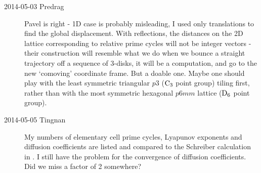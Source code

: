 \begin{description}
\item[2014-05-03 Predrag] Pavel is right - 1D case is probably
misleading, I used only translations to find the global displacement.
With reflections, the distances on the 2D lattice corresponding to
relative prime cycles will not be integer vectors - their construction
will resemble what we do when we bounce a straight trajectory off a
sequence of 3-disks, it will be a computation, and go to the new
`comoving' coordinate frame. But a doable one. Maybe one should play with
the least symmetric triangular $p3$ ($\textrm{C}_{3}$ point group) tiling first,
rather than with the most symmetric hexagonal $p6mm$ lattice ($\textrm{D}_{6}$
point group).

\item[2014-05-05 Tingnan] My numbers of elementary cell prime cycles,
Lyapunov exponents and diffusion coefficients are listed and compared
to the Schreiber calculation in . I still have the problem
for the convergence of diffusion coefficients. Did we miss a factor of 2
somewhere?


\end{description}
